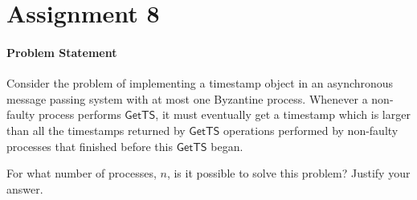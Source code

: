 \documentclass[11pt]{article}
\newcommand\GetTS{\mathsf{GetTS}}
\begin{document}
\rhead{\today}

\section*{Assignment 8}
\paragraph{Problem Statement}
Consider the problem of implementing a timestamp object in an asynchronous message passing system with at most one Byzantine process. Whenever a non-faulty process performs $\GetTS$, it must eventually get a timestamp which is larger than all the timestamps returned by $\GetTS$ operations performed by non-faulty processes that finished  before this $\GetTS$ began.

For what number of processes, $n$, is it possible to solve this problem? Justify your answer.
\end{document}
